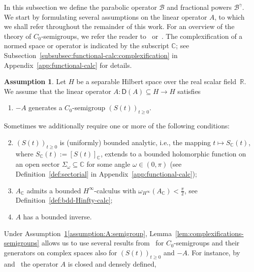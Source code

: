 \documentclass[reqno]{amsart}
\numberwithin{equation}{section}
\newcommand{\R}{\mathbb{R}}
\newcommand{\C}{\mathbb{C}}
\newcommand{\cB}{\mathcal{B}}
\newcommand{\from}{\colon}
\theoremstyle{remark}
\theoremstyle{definition}
\newtheorem{assumption}[lemma]{Assumption}
\begin{document}
In this subsection we define the parabolic operator $\cB$ 
and fractional powers $\cB^\gamma$\!. 
We start by formulating several assumptions on 
the linear operator $A$, 
to which we shall refer throughout the remainder of this work. 
For an overview of the theory of $C_0$-semigroups, 
we refer the reader to~\cite{Engel1999} 
or~\cite{Pazy1983}. 
The complexification of a normed space or operator
is indicated by the subscript $\C$; 
see Subsection~\ref{subsubsec:functional-calc:complexification} in 
Appendix~\ref{app:functional-calc} 
for details. 
% 
\begin{assumption}\label{assumption:A}
	Let $H$ be a separable Hilbert space
	over the real scalar field~$\R$. 
	We assume that the linear operator
	${A\from \mathsf D(A)\subseteq H \to H}$ satisfies 
	\begin{enumerate}[leftmargin=1cm, label=(\roman*)]
		\item\label{assumption:A:semigroup}
		$-A$ generates a $C_0$-semigroup $(S(t))_{t\geq 0}$. 
	\end{enumerate}
	Sometimes we additionally require 
	one or more of the following conditions:
	\begin{enumerate}[leftmargin=1cm, label=(\roman*)] 
		\setcounter{enumi}{1}
		\item\label{assumption:A:bdd-analytic}  
		$(S(t))_{t\geq 0}$ is (uniformly) bounded analytic, 
		i.e., the mapping ${t \mapsto S_{\C}(t)}$, 
		where ${S_{\C}(t) := [S(t)]_{\C}}$, 
		extends to a bounded holomorphic function 
		on an open sector $\Sigma_\omega \subseteq \C$ 
		for some angle 
		$\omega\in(0,\pi)$ 
		(see Definition~\ref{def:sectorial} 
		in Appendix~\ref{app:functional-calc}); 
		\item\label{assumption:A:bdd-Hinfty}  
		$A_{\C}$ admits a bounded $H^\infty$-calculus 
		with $\omega_{H^\infty}(A_\C)<\tfrac{\pi}{2}$, 
		see Definition~\ref{def:bdd-Hinfty-calc}; 
		\item\label{assumption:A:bddly-inv}  
		$A$ has a bounded inverse. 
	\end{enumerate}
\end{assumption} 
% 
Under Assumption~\ref{assumption:A}\ref{assumption:A:semigroup}, 
Lemma~\ref{lem:complexifications-semigroups} allows us to 
use several results from~\cite{Engel1999,Haase2006,Pazy1983} 
for $C_0$-semigroups and their generators 
on complex spaces 
also for $(S(t))_{t\geq 0}$ and $-A$. 
% 
For instance, by~\cite[Theorem~II.1.4]{Engel1999} 
and~\cite[Chapter~1, Theorem~2.2]{Pazy1983}
the operator $A$ is closed and densely defined, 
\end{document}
